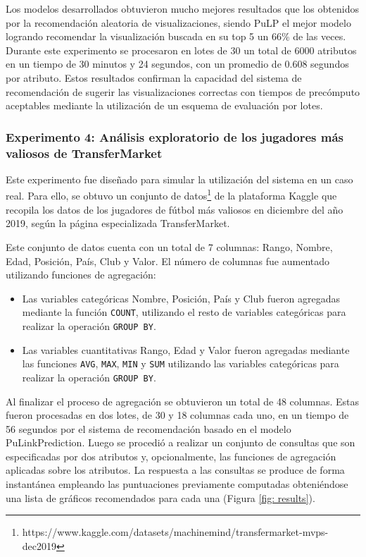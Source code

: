     Los modelos desarrollados obtuvieron mucho mejores resultados que los obtenidos por la recomendaci\'on aleatoria
    de visualizaciones, siendo PuLP el mejor modelo logrando recomendar la visualizaci\'on
    buscada en su top 5 un 66\% de las veces.
    Durante este experimento se procesaron en lotes de 30 un total de 6000 atributos en un tiempo de 30 minutos y 24 segundos, con un promedio de 0.608 segundos
    por atributo. Estos resultados confirman la capacidad del sistema de recomendaci\'on de sugerir las visualizaciones
    correctas con tiempos de prec\'omputo aceptables mediante la utilizaci\'on 
    de un esquema de evaluaci\'on por lotes.

    \subsubsection{Experimento 4: An\'alisis exploratorio de los jugadores m\'as valiosos de TransferMarket}

    Este experimento fue dise\~nado para simular la utilizaci\'on del sistema en un caso
    real. Para ello, se obtuvo un conjunto de datos\footnote[1]{https://www.kaggle.com/datasets/machinemind/transfermarket-mvps-dec2019} de la plataforma Kaggle que recopila
    los datos de los jugadores de f\'utbol m\'as valiosos en diciembre del a\~no 2019, seg\'un la p\'agina especializada TransferMarket.

    Este conjunto de datos cuenta con un total de 7 columnas: Rango, Nombre, Edad, Posici\'on, Pa\'is, Club y Valor.
    El n\'umero de columnas fue aumentado utilizando funciones de agregaci\'on: \begin{itemize}
        \item Las variables categ\'oricas Nombre, Posici\'on, Pa\'is y Club fueron agregadas mediante
        la funci\'on \texttt{COUNT}, utilizando el resto de variables categ\'oricas para realizar la operaci\'on \texttt{GROUP BY}.
        \item Las variables cuantitativas Rango, Edad y Valor fueron agregadas mediante las funciones \texttt{AVG}, \texttt{MAX}, \texttt{MIN} y \texttt{SUM}
        utilizando las variables categ\'oricas para realizar la operaci\'on \texttt{GROUP BY}.

    \end{itemize}

    Al finalizar el proceso de agregaci\'on se obtuvieron un total de 48 columnas. Estas
    fueron procesadas en dos lotes, de 30 y 18 columnas cada uno, en un tiempo de 56 segundos por el sistema de
    recomendaci\'on basado en el modelo PuLinkPrediction. Luego se procedi\'o a realizar
    un conjunto de consultas que son especificadas por dos atributos y, opcionalmente,
    las funciones de agregaci\'on aplicadas sobre los atributos. La respuesta a las consultas se produce de forma instant\'anea
    empleando las puntuaciones previamente computadas obteni\'endose una lista de gr\'aficos recomendados para cada una (Figura \ref{fig: results}).


